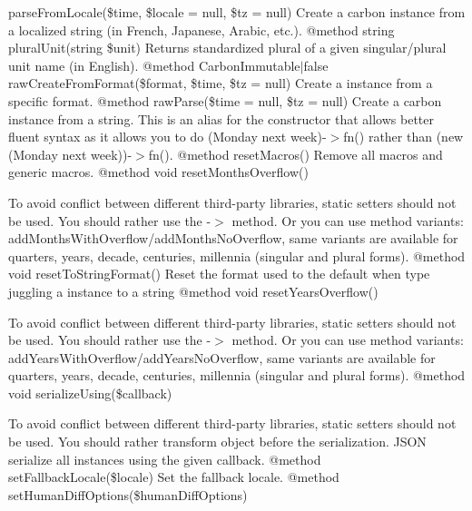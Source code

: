 \begin{DoxyRefList}
parse\+From\+Locale(\$time, \$locale = null, \$tz = null) Create a carbon instance from a localized string (in French, Japanese, Arabic, etc.). @method string plural\+Unit(string \$unit) Returns standardized plural of a given singular/plural unit name (in English). @method Carbon\+Immutable\texorpdfstring{$\vert$}{|}false raw\+Create\+From\+Format(\$format, \$time, \$tz = null) Create a  instance from a specific format. @method  raw\+Parse(\$time = null, \$tz = null) Create a carbon instance from a string. This is an alias for the constructor that allows better fluent syntax as it allows you to do (\textquotesingle{}Monday next week\textquotesingle{})-\/\texorpdfstring{$>$}{>}fn() rather than (new (\textquotesingle{}Monday next week\textquotesingle{}))-\/\texorpdfstring{$>$}{>}fn(). @method  reset\+Macros() Remove all macros and generic macros. @method void reset\+Months\+Overflow() 



To avoid conflict between different third-\/party libraries, static setters should not be used. You should rather use the -\/\texorpdfstring{$>$}{>} method. Or you can use method variants\+: add\+Months\+With\+Overflow/add\+Months\+No\+Overflow, same variants are available for quarters, years, decade, centuries, millennia (singular and plural forms). @method void reset\+To\+String\+Format() Reset the format used to the default when type juggling a  instance to a string @method void reset\+Years\+Overflow() 



To avoid conflict between different third-\/party libraries, static setters should not be used. You should rather use the -\/\texorpdfstring{$>$}{>} method. Or you can use method variants\+: add\+Years\+With\+Overflow/add\+Years\+No\+Overflow, same variants are available for quarters, years, decade, centuries, millennia (singular and plural forms). @method void serialize\+Using(\$callback) 



To avoid conflict between different third-\/party libraries, static setters should not be used. You should rather transform  object before the serialization. JSON serialize all  instances using the given callback. @method  set\+Fallback\+Locale(\$locale) Set the fallback locale. @method  set\+Human\+Diff\+Options(\$human\+Diff\+Options) 




\end{DoxyRefList}

